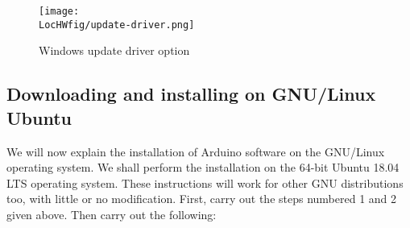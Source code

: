 \begin{figure}
      \centering
      \texttt{[image: \\LocHWfig/update-driver.png]}
      \caption{Windows update driver option}
      \label{win-dri-update}
\end{figure}


\subsection{Downloading and installing on GNU/Linux Ubuntu}
We will now explain the installation of Arduino software on the
GNU/Linux operating system. We shall perform the installation on the 64-bit 
Ubuntu 18.04 LTS operating system.  These
instructions will work for other GNU distributions too, with little or
no modification.  First, carry out the steps numbered 1 and 2 given
above.  Then carry out the following:

